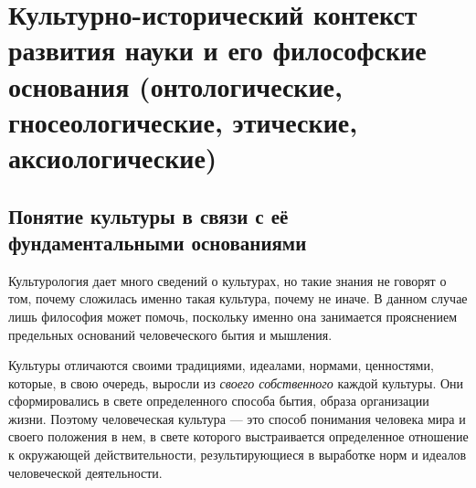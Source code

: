 \section[Культурно-исторический контекст развития науки и его философские основания]{Культурно-исторический контекст развития науки и его философские основания
(онтологические, гносеологические, этические, аксиологические)}

\subsection{Понятие культуры в связи с её фундаментальными основаниями}

Культурология дает много сведений о культурах, но такие знания не говорят о том, 
почему сложилась именно такая культура, почему не иначе. В данном случае лишь философия 
может помочь, поскольку именно она занимается прояснением предельных
оснований человеческого бытия и мышления. 

Культуры отличаются своими традициями, идеалами, нормами, ценностями,
которые, в свою очередь, выросли из \textit{своего собственного} каждой культуры. Они
сформировались в свете определенного способа бытия, образа организации жизни.
Поэтому человеческая культура --- это способ понимания человека мира и своего положения в нем, в свете которого
выстраивается определенное отношение к окружающей действительности,
результирующиеся в выработке норм и идеалов человеческой деятельности. 



